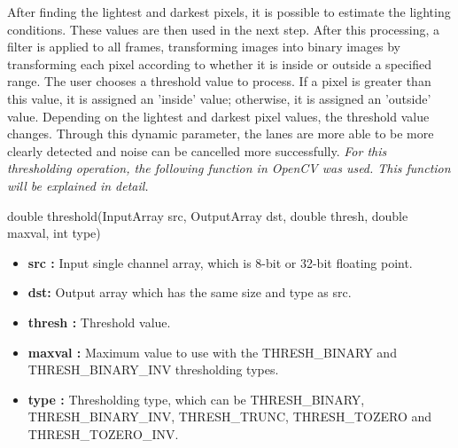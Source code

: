 After finding the lightest and darkest pixels, it is possible to estimate the lighting conditions. These values are then used in the next step. After this processing, a filter is applied to all frames, transforming images into binary images by transforming each pixel according to whether it is inside or outside a specified range. The user chooses a threshold value to process. If a pixel is greater than this value, it is assigned an 'inside' value; otherwise, it is assigned an 'outside' value. Depending on the lightest and darkest pixel values, the threshold value changes. Through this dynamic parameter, the lanes are more able to be more clearly detected and noise can be cancelled more successfully. \emph{\color{blue}For this thresholding operation, the following function in OpenCV was used. This function will be explained in detail.}\citep{threshold}


\begin{center}

double threshold(InputArray src, OutputArray dst, double thresh, double maxval, int type)

\end{center}

\begin{itemize}

\item \textbf{src : }Input single channel array, which is 8-bit or 32-bit floating point.

\item \textbf{dst: }Output array which has the same size and type as src. 

\item \textbf{thresh : }Threshold value.

\item \textbf{maxval : }Maximum value to use with the THRESH\_BINARY and THRESH\_BINARY\_INV thresholding types.

\item \textbf{type : }Thresholding type, which can be THRESH\_BINARY, THRESH\_BINARY\_INV, THRESH\_TRUNC, THRESH\_TOZERO and THRESH\_TOZERO\_INV.

\end{itemize}






















